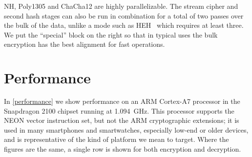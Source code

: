 \documentclass[journal=tosc,preprint,floatrow,submission]{iacrtrans}
\begin{document}
NH, Poly1305 and ChaCha12 are highly parallelizable.
The stream cipher and second hash stages can also be run in combination for a total
of two passes over the bulk of the data, unlike a mode such as HEH~\cite{heh}
which requires at least three.
We put the ``special'' block on the right so that in typical uses the bulk encryption has
the best alignment for fast operations.

\section{Performance}

In \autoref{performance} we
show performance on an ARM \mbox{Cortex-A7}
processor in the Snapdragon 2100 chipset running at \mbox{1.094 GHz}.  This
processor supports the NEON vector instruction set, but not the ARM cryptographic
extensions; it is used in many smartphones and smartwatches, especially low-end
or older devices, and is representative of the kind of platform we mean to target.
Where the figures are the same, a single row is shown for both encryption and decryption.
\end{document}
